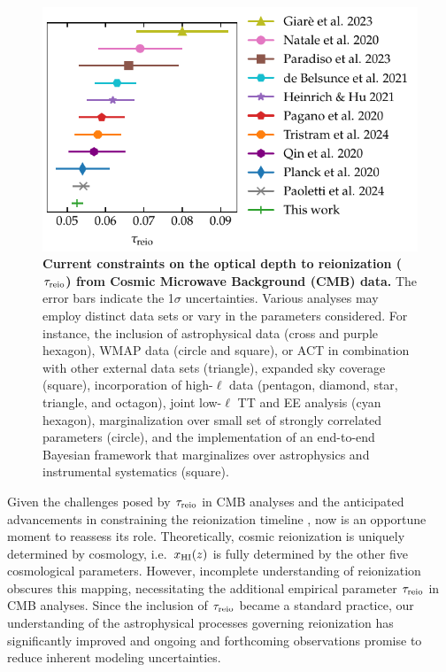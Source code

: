 \begin{figure}[tb]
\centering
\includegraphics{figs/tau_fig.pdf}
\caption{\textbf{Current constraints on the optical depth to
reionization ($\tau_{\mathrm{reio}}$) from Cosmic Microwave Background (CMB)
data.}
The error bars indicate the 1$\sigma$ uncertainties.
Various analyses may employ distinct data sets or vary in the parameters
considered.
For instance, the inclusion of astrophysical data \cite{Qin2020,
Paoletti2024} (cross and purple hexagon), WMAP data \cite{Natale2020,
Paradiso2023} (circle and square), or ACT in combination with other
external data sets \cite{Giare2023} (triangle), expanded sky coverage
\cite{Paradiso2023} (square), incorporation of high-$\ell$ data
\cite{Pagano2020, Planck2020a, HeinrichHu2021, Giare2023, Tristram2024}
(pentagon, diamond, star, triangle, and octagon), joint low-$\ell$ TT
and EE analysis \cite{deBelsunce2021} (cyan hexagon), marginalization
over small set of strongly correlated parameters \cite{Natale2020}
(circle), and the implementation of an end-to-end Bayesian framework
that marginalizes over astrophysics and instrumental systematics
\cite{Paradiso2023} (square).}
\label{fig:tau}
\end{figure}

Given the challenges posed by $\tau_{\mathrm{reio}}$ in CMB analyses and the
anticipated advancements in constraining the reionization
timeline \cite{Montero2021, Hera2022}, now is an opportune moment to
reassess its role.
Theoretically, cosmic reionization is uniquely determined by cosmology,
i.e.\ $x_{\mathrm{HI}}(z)$ is fully determined by the other five cosmological
parameters.
However, incomplete understanding of reionization obscures this mapping,
necessitating the additional empirical parameter $\tau_{\mathrm{reio}}$ in CMB
analyses.
Since the inclusion of $\tau_{\mathrm{reio}}$ became a standard practice, our
understanding of the astrophysical processes governing reionization has
significantly improved \cite{Gnedin2022, Kannan2022,Murray2020, Fan2023}
and ongoing and forthcoming observations promise to reduce inherent
modeling uncertainties.

